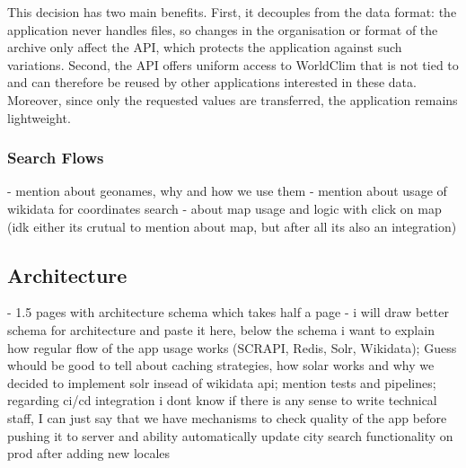 This decision has two main benefits. First, it decouples \webappname{} from the data
format: the application never handles files, so changes in the organisation or format
of the archive only affect the API, which protects the application against such
variations. Second, the API offers uniform access to WorldClim that is not tied to
\webappname{} and can therefore be reused by other applications interested in these
data. Moreover, since only the requested values are transferred, the application
remains lightweight.



\subsubsection{Search Flows}\label{sec:web-application:data:search-flows}
- mention about geonames, why and how we use them
- mention about usage of wikidata for coordinates search
- about map usage and logic with click on map (idk either its crutual to mention about map, but after all its also an integration)

\subsection{Architecture}\label{sec:web-application:architecture}
- 1.5 pages with architecture schema which takes half a page
- i will draw better schema for architecture and paste it here, below the schema i want to explain how regular flow of the app 
usage works (SCRAPI, Redis, Solr, Wikidata); Guess whould be good to tell about caching strategies, how solar works and why
we decided to implement solr insead of wikidata api; mention 
tests and pipelines; 
regarding ci/cd integration i dont know if there is any sense to write technical staff, I can just say
that we have mechanisms to check quality of the app before pushing it to server and ability automatically update city search 
functionality on prod after adding new locales

